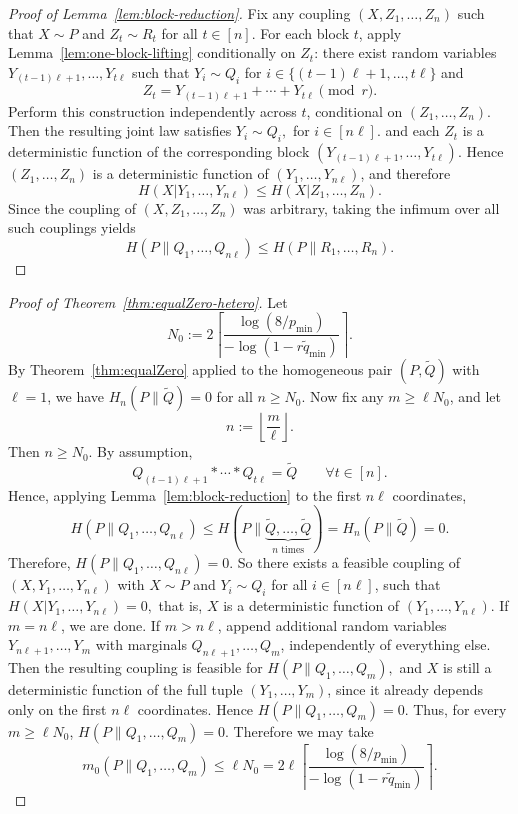 \documentclass[journal]{IEEEtran}
\newcommand{\1}{\mathbf{1}}
\begin{document}
\begin{proof}[Proof of Lemma~\ref{lem:block-reduction}]
Fix any coupling \((X,Z_1,\dots,Z_n)\) such that $X\sim P$ and  $Z_t\sim R_t$ for all $t\in[n]$.
For each block \(t\), apply Lemma~\ref{lem:one-block-lifting} conditionally on \(Z_t\): there exist random variables \(Y_{(t-1)\ell+1},\dots,Y_{t\ell}\)
such that \(Y_i\sim Q_i\) for $i\in\{(t-1)\ell+1,\dots,t\ell\}$
and
\[Z_t=Y_{(t-1)\ell+1}+\cdots+Y_{t\ell}\pmod r.\]
Perform this construction independently across \(t\), conditional on \((Z_1,\dots,Z_n)\). Then the resulting joint law satisfies
\(Y_i\sim Q_i,\) for $i\in[n\ell]$.
and each \(Z_t\) is a deterministic function of the corresponding block
\((Y_{(t-1)\ell+1},\dots,Y_{t\ell}).\)
Hence \((Z_1,\dots,Z_n)\) is a deterministic function of \((Y_1,\dots,Y_{n\ell})\), and therefore
\[
H(X| Y_1,\dots,Y_{n\ell})\le H(X| Z_1,\dots,Z_n).
\]
Since the coupling of \((X,Z_1,\dots,Z_n)\) was arbitrary, taking the infimum over all such couplings yields
\[
H(P\|Q_1,\dots,Q_{n\ell})
\le
H(P\|R_1,\dots,R_n).
\]
\end{proof}

\begin{proof}[Proof of Theorem~\ref{thm:equalZero-hetero}]
Let
\[
N_0
:=
2\left\lceil
\frac{\log(8/p_{\min})}{-\log(1-r\widetilde q_{\min})}
\right\rceil.
\]
By Theorem~\ref{thm:equalZero} applied to the homogeneous pair \((P,\widetilde Q)\) with \(\ell=1\), we have
\(H_n(P\|\widetilde Q)=0\) for all $n\ge N_0$. Now fix any \(m\ge \ell N_0\), and let \[n:=\left\lfloor \frac{m}{\ell}\right\rfloor.\]
Then \(n\ge N_0\). By assumption,
\[
Q_{(t-1)\ell+1} * \cdots * Q_{t\ell}
=
\widetilde Q
\qquad \forall t\in[n].
\]
Hence, applying Lemma~\ref{lem:block-reduction} to the first \(n\ell\) coordinates,
\[
H(P\|Q_1,\dots,Q_{n\ell})
\le
H(P\|\underbrace{\widetilde Q,\dots,\widetilde Q}_{n\text{ times}})
=
H_n(P\|\widetilde Q)
=
0.
\]
Therefore, \(H(P\|Q_1,\dots,Q_{n\ell})=0.\)
So there exists a feasible coupling of
\((X,Y_1,\dots,Y_{n\ell})\)
with $X\sim P$ and $Y_i\sim Q_i$ for all $i\in[n\ell]$, 
such that
\(H(X| Y_1,\dots,Y_{n\ell})=0,\)
that is, \(X\) is a deterministic function of \((Y_1,\dots,Y_{n\ell})\).
If \(m=n\ell\), we are done. If \(m>n\ell\), append additional random variables
\(Y_{n\ell+1},\dots,Y_m\)
with marginals \(Q_{n\ell+1},\dots,Q_m\), independently of everything else. Then the resulting coupling is feasible for
\(H(P\|Q_1,\dots,Q_m),\)
and \(X\) is still a deterministic function of the full tuple \((Y_1,\dots,Y_m)\), since it already depends only on the first \(n\ell\) coordinates. Hence
\(H(P\|Q_1,\dots,Q_m)=0.\)
Thus, for every \(m\ge \ell N_0\),
\(H(P\|Q_1,\dots,Q_m)=0.\)
Therefore we may take
\[
m_0(P\|Q_1, \dots, Q_m)\le \ell N_0
=
2\ell\left\lceil
\frac{\log(8/p_{\min})}{-\log(1-r\widetilde q_{\min})}
\right\rceil.
\]
\end{proof}
\end{document}

